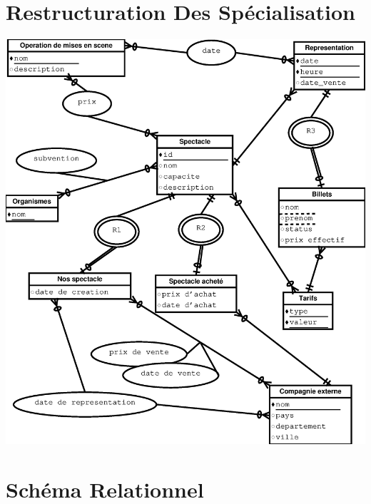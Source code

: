 \documentclass[10pt]{report}
\begin{document}
\chapter{Restructuration Des Spécialisation}
\includegraphics[width=15cm]{relationnel_diagramme.eps}
\chapter{Schéma Relationnel}
\end{document}
